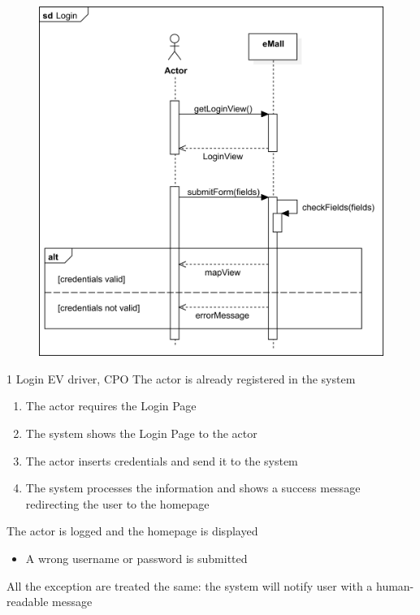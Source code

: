 \usecase
{
    \begin{figure}[H]
        \centering
        \includegraphics[scale=0.9]{src/sequence_diagram/login.png}
    \end{figure}
}
{1}
{Login}
{EV driver, CPO}
{The actor is already registered in the system}
{
    \begin{enumerate}
        \item The actor requires the Login Page
        \item The system shows the Login Page to the actor
        \item The actor inserts credentials and send it to the system
        \item The system processes the information and shows a success message redirecting the user to the homepage
    \end{enumerate}
}
{The actor is logged and the homepage is displayed}
{
    \begin{itemize}
        \item A wrong username or password is submitted
    \end{itemize}
}
{
    All the exception are treated the same: the system will notify user with a human-readable message
}

